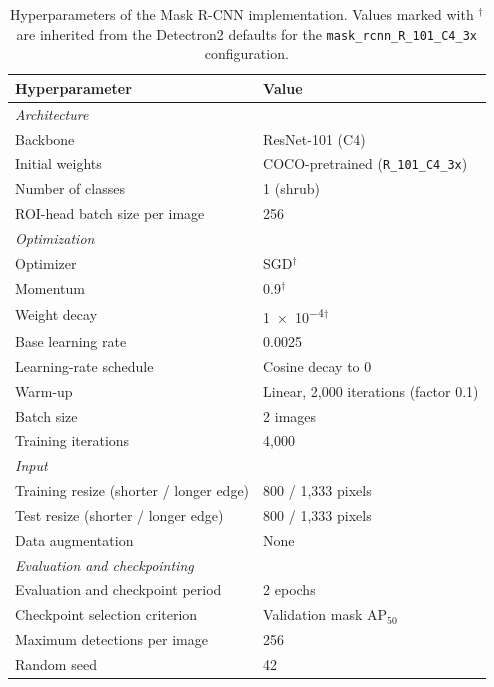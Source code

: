 \documentclass[12pt,a4paper]{article}
\begin{document}
\begin{table}[ht]
    \centering
    \caption{
        Hyperparameters of the Mask R-CNN implementation. Values marked with $^{\dagger}$ are inherited from the Detectron2 defaults for the \texttt{mask\_rcnn\_R\_101\_C4\_3x} configuration.
    }
    \label{tab:maskrcnn_hparams}
    \begin{tabular}{ll}
        \toprule
        Hyperparameter & Value \\
        \midrule
        \multicolumn{2}{l}{\textit{Architecture}} \\
        Backbone & ResNet-101 (C4) \\
        Initial weights & COCO-pretrained (\texttt{R\_101\_C4\_3x}) \\
        Number of classes & 1 (shrub) \\
        ROI-head batch size per image & 256 \\
        \midrule
        \multicolumn{2}{l}{\textit{Optimization}} \\
        Optimizer & SGD$^{\dagger}$ \\
        Momentum & 0.9$^{\dagger}$ \\
        Weight decay & \num{1e-4}$^{\dagger}$ \\
        Base learning rate & 0.0025 \\
        Learning-rate schedule & Cosine decay to 0 \\
        Warm-up & Linear, 2,000 iterations (factor 0.1) \\
        Batch size & 2 images \\
        Training iterations & 4,000 \\
        \midrule
        \multicolumn{2}{l}{\textit{Input}} \\
        Training resize (shorter / longer edge) & 800 / 1,333 pixels \\
        Test resize (shorter / longer edge) & 800 / 1,333 pixels \\
        Data augmentation & None \\
        \midrule
        \multicolumn{2}{l}{\textit{Evaluation and checkpointing}} \\
        Evaluation and checkpoint period & 2 epochs \\
        Checkpoint selection criterion & Validation mask AP$_{50}$ \\
        Maximum detections per image & 256 \\
        Random seed & 42 \\
        \bottomrule
    \end{tabular}
\end{table}
\end{document}

